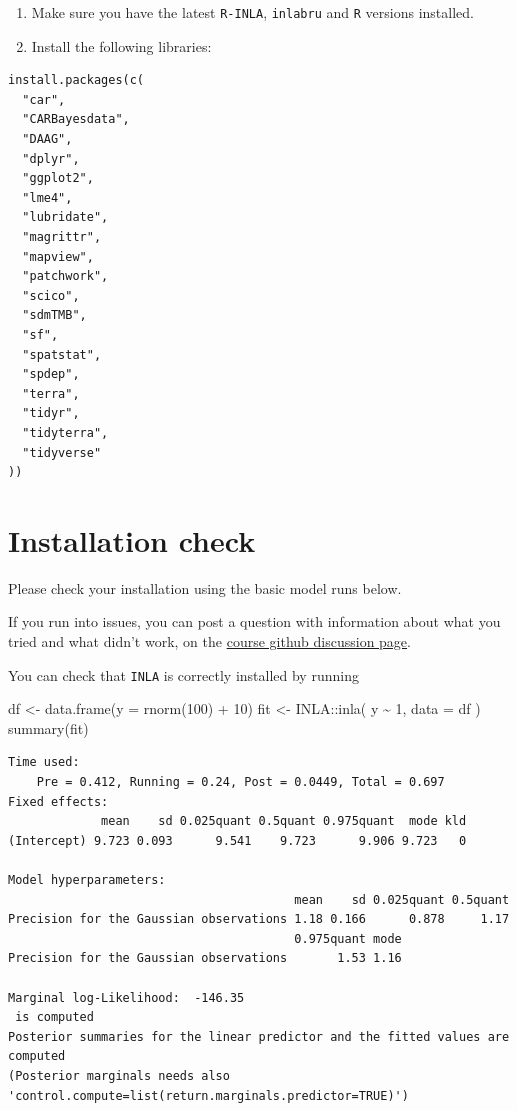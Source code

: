 \documentclass[
  letterpaper,
  DIV=11,
  numbers=noendperiod]{scrartcl}
\newenvironment{Shaded}{\begin{snugshade}}{\end{snugshade}}
\newcommand{\AttributeTok}[1]{\textcolor[rgb]{0.40,0.45,0.13}{#1}}
\newcommand{\DecValTok}[1]{\textcolor[rgb]{0.68,0.00,0.00}{#1}}
\newcommand{\FunctionTok}[1]{\textcolor[rgb]{0.28,0.35,0.67}{#1}}
\newcommand{\NormalTok}[1]{\textcolor[rgb]{0.00,0.23,0.31}{#1}}
\newcommand{\OtherTok}[1]{\textcolor[rgb]{0.00,0.23,0.31}{#1}}
\newcommand{\SpecialCharTok}[1]{\textcolor[rgb]{0.37,0.37,0.37}{#1}}
\begin{document}
\begin{enumerate}
\def\labelenumi{\arabic{enumi}.}
\setcounter{enumi}{2}
\item
  Make sure you have the latest \texttt{R-INLA}, \texttt{inlabru} and
  \texttt{R} versions installed.
\item
  Install the following libraries:
\end{enumerate}

\begin{verbatim}
install.packages(c(
  "car",
  "CARBayesdata",
  "DAAG",
  "dplyr",
  "ggplot2",
  "lme4",
  "lubridate",
  "magrittr",
  "mapview",
  "patchwork",
  "scico",
  "sdmTMB",
  "sf",
  "spatstat",
  "spdep",
  "terra",
  "tidyr",
  "tidyterra",
  "tidyverse"
))
\end{verbatim}

\section{Installation check}\label{installation-check}

Please check your installation using the basic model runs below.

If you run into issues, you can post a question with information about
what you tried and what didn't work, on the
\href{https://github.com/smar-git/inlabru_newCaledonia/discussions}{course
github discussion page}.

You can check that \texttt{INLA} is correctly installed by running

\begin{Shaded}
\begin{Highlighting}[]
\NormalTok{df }\OtherTok{\textless{}{-}} \FunctionTok{data.frame}\NormalTok{(}\AttributeTok{y =} \FunctionTok{rnorm}\NormalTok{(}\DecValTok{100}\NormalTok{) }\SpecialCharTok{+} \DecValTok{10}\NormalTok{)}
\NormalTok{fit }\OtherTok{\textless{}{-}}\NormalTok{ INLA}\SpecialCharTok{::}\FunctionTok{inla}\NormalTok{(}
\NormalTok{  y }\SpecialCharTok{\textasciitilde{}} \DecValTok{1}\NormalTok{,}
  \AttributeTok{data =}\NormalTok{ df}
\NormalTok{)}
\FunctionTok{summary}\NormalTok{(fit)}
\end{Highlighting}
\end{Shaded}

\begin{verbatim}
Time used:
    Pre = 0.412, Running = 0.24, Post = 0.0449, Total = 0.697 
Fixed effects:
             mean    sd 0.025quant 0.5quant 0.975quant  mode kld
(Intercept) 9.723 0.093      9.541    9.723      9.906 9.723   0

Model hyperparameters:
                                        mean    sd 0.025quant 0.5quant
Precision for the Gaussian observations 1.18 0.166      0.878     1.17
                                        0.975quant mode
Precision for the Gaussian observations       1.53 1.16

Marginal log-Likelihood:  -146.35 
 is computed 
Posterior summaries for the linear predictor and the fitted values are computed
(Posterior marginals needs also 'control.compute=list(return.marginals.predictor=TRUE)')
\end{verbatim}
\end{document}
